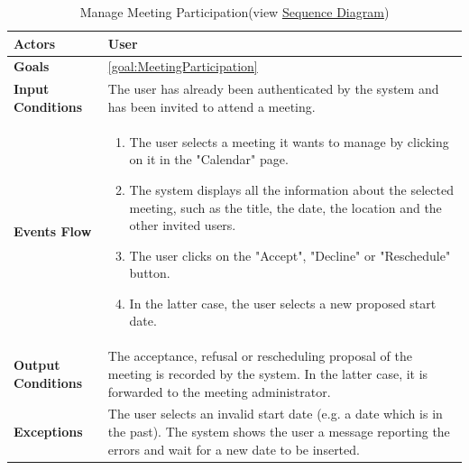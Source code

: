 \begin{table}[H]
	\centering
	\def\arraystretch{1.5}
	\begin{tabular}{|m{7cm}|m{7cm}|}
		\hline
		\textbf{Actors}            & User		    \\ \hline
		\textbf{Goals}             & \ref{goal:MeetingParticipation}           \\ \hline
		\textbf{Input Conditions}  & The user has already been authenticated by the system and has been invited to attend a meeting.           \\ \hline
		\textbf{Events Flow}       & 
			\begin{enumerate}[topsep=0pt, leftmargin=*]
				\item The user selects a meeting it wants to manage by clicking on it in the "Calendar" page.
				\item The system displays all the information about the selected meeting, such as the title, the date, the location and the other invited users.
				\item The user clicks on the "Accept", "Decline" or "Reschedule" button.
				\item In the latter case, the user selects a new proposed start date.
			\end{enumerate}           \\ \hline
		\textbf{Output Conditions} & The acceptance, refusal or rescheduling proposal of the meeting is recorded by the system. In the latter case, it is forwarded to the meeting administrator.           \\ \hline
		\textbf{Exceptions}        & The user selects an invalid start date (e.g. a date which is in the past). The system shows the user a message reporting the errors and wait for a new date to be inserted.           \\ \hline
	\end{tabular}
	\caption[Manage Meeting Participation]{{Manage Meeting Participation}\label{UseCaseDescr:MeetingPart} (view \hyperref[SeqDiagr:MeetingPart]{Sequence Diagram})}
\end{table}

